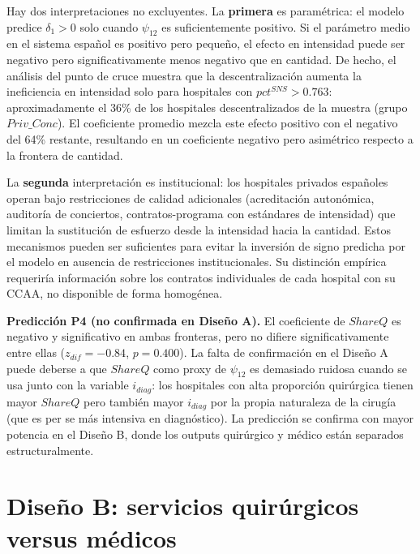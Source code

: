 Hay dos interpretaciones no excluyentes. La \textbf{primera} es paramétrica: el modelo predice $\delta_1 > 0$ solo cuando $\psi_{12}$ es suficientemente positivo. Si el parámetro medio en el sistema español es positivo pero pequeño, el efecto en intensidad puede ser negativo pero significativamente menos negativo que en cantidad. De hecho, el análisis del punto de cruce muestra que la descentralización aumenta la ineficiencia en intensidad solo para hospitales con $pct^{SNS} > 0.763$: aproximadamente el 36\% de los hospitales descentralizados de la muestra (grupo $Priv\_Conc$). El coeficiente promedio mezcla este efecto positivo con el negativo del 64\% restante, resultando en un coeficiente negativo pero asimétrico respecto a la frontera de cantidad.

La \textbf{segunda} interpretación es institucional: los hospitales privados españoles operan bajo restricciones de calidad adicionales (acreditación autonómica, auditoría de conciertos, contratos-programa con estándares de intensidad) que limitan la sustitución de esfuerzo desde la intensidad hacia la cantidad. Estos mecanismos pueden ser suficientes para evitar la inversión de signo predicha por el modelo en ausencia de restricciones institucionales. Su distinción empírica requeriría información sobre los contratos individuales de cada hospital con su CCAA, no disponible de forma homogénea.

\textbf{Predicción P4 (no confirmada en Diseño A).} El coeficiente de $ShareQ$ es negativo y significativo en ambas fronteras, pero no difiere significativamente entre ellas ($z_{dif}=-0.84$, $p=0.400$). La falta de confirmación en el Diseño A puede deberse a que $ShareQ$ como proxy de $\psi_{12}$ es demasiado ruidosa cuando se usa junto con la variable $i_{diag}$: los hospitales con alta proporción quirúrgica tienen mayor $ShareQ$ pero también mayor $i_{diag}$ por la propia naturaleza de la cirugía (que es per se más intensiva en diagnóstico). La predicción se confirma con mayor potencia en el Diseño B, donde los outputs quirúrgico y médico están separados estructuralmente.


\section{Diseño B: servicios quirúrgicos versus médicos}
\label{sec:res_B}


